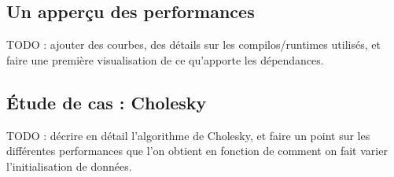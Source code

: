 \subsection{Un apperçu des performances}

TODO : ajouter des courbes, des détails sur les compilos/runtimes utilisés, et faire une première visualisation de ce qu'apporte les dépendances.

\subsection{Étude de cas : Cholesky}

TODO : décrire en détail l'algorithme de Cholesky, et faire un point sur les différentes performances que l'on obtient en fonction de comment on fait varier l'initialisation de données.


